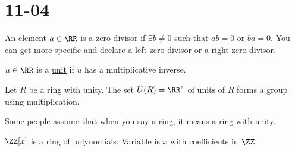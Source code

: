 \documentclass[class=scrartcl, crop=false]{standalone}
\date{2019-11-04}
\begin{document}
\section{11-04}

\begin{definition}
  An element $a \in \RR$ is a \ul{zero-divisor} if $\exists b \neq 0$ such that $ab = 0$ or $ba = 0$. You can get more specific and declare a left zero-divisor or a right zero-divisor.
\end{definition} 
\begin{definition}
  $u \in \RR$ is a \ul{unit} if $u$ has a multiplicative inverse.
\end{definition} 

\begin{lemma}
  Let $R$ be a ring with unity. The set $U(R) = \RR^*$ of units of $R$ forms a group using multiplication.
\end{lemma} 

\begin{note}
  Some people assume that when you say a ring, it means a ring with unity.
\end{note} 

\begin{recall}
  $\ZZ[x]$ is a ring of polynomials. Variable is $x$ with coefficients in $\ZZ$.
\end{recall} 
\end{document}
